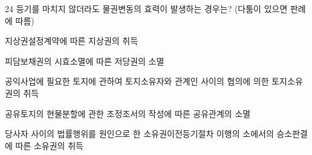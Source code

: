 \begin{question}{24}
등기를 마치지 않더라도 물권변동의 효력이 발생하는 경우는? (다툼이 있으면 판례에 따름)
\begin{choices}
  \item 지상권설정계약에 따른 지상권의 취득
  \item 피담보채권의 시효소멸에 따른 저당권의 소멸
  \item 공익사업에 필요한 토지에 관하여 토지소유자와 관계인 사이의 협의에 의한 토지소유권의 취득
  \item 공유토지의 현물분할에 관한 조정조서의 작성에 따른 공유관계의 소멸
  \item 당사자 사이의 법률행위를 원인으로 한 소유권이전등기절차 이행의 소에서의 승소판결에 따른 소유권의 취득
\end{choices}
\end{question}
